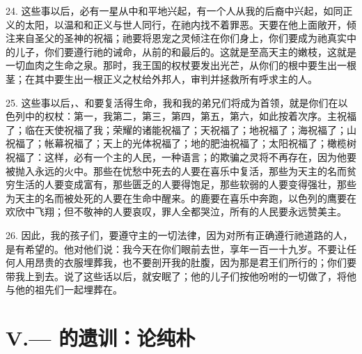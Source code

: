 24. 这些事以后，必有一星从中和平地兴起，有一个人从我的后裔中兴起，如同正义的太阳，以温和和正义与世人同行，在祂内找不着罪恶。天要在他上面敞开，倾注来自圣父的圣神的祝福；祂要将恩宠之灵倾注在你们身上，你们要成为祂真实中的儿子，你们要遵行祂的诫命，从前的和最后的。这就是至高天主的嫩枝，这就是一切血肉之生命之泉。那时，我王国的权杖要发出光芒，从你们的根中要生出一根茎；在其中要生出一根正义之杖给外邦人，审判并拯救所有呼求主的人。\par

25. 这些事以后，、和要复活得生命，我和我的弟兄们将成为首领，就是你们在以色列中的权杖：第一，我第二，第三，第四，第五，第六，如此按着次序。主祝福了；临在天使祝福了我；荣耀的诸能祝福了；天祝福了；地祝福了；海祝福了；山祝福了；帐幕祝福了；天上的光体祝福了；地的肥油祝福了；太阳祝福了；橄榄树祝福了：这样，必有一个主的人民，一种语言；的欺骗之灵将不再存在，因为他要被抛入永远的火中。那些在忧愁中死去的人要在喜乐中复活，那些为天主的名而贫穷生活的人要变成富有，那些匮乏的人要得饱足，那些软弱的人要变得强壮，那些为天主的名而被处死的人要在生命中醒来。的鹿要在喜乐中奔跑，以色列的鹰要在欢欣中飞翔；但不敬神的人要哀叹，罪人全都哭泣，所有的人民要永远赞美主。\par

26. 因此，我的孩子们，要遵守主的一切法律，因为对所有正确遵行祂道路的人，是有希望的。他对他们说：我今天在你们眼前去世，享年一百一十九岁。不要让任何人用昂贵的衣服埋葬我，也不要剖开我的肚腹，因为那是君王们所行的；你们要带我上到去。说了这些话以后，就安眠了；他的儿子们按他吩咐的一切做了，将他与他的祖先们一起埋葬在。\par


\section{V.— 的遗训：论纯朴}

